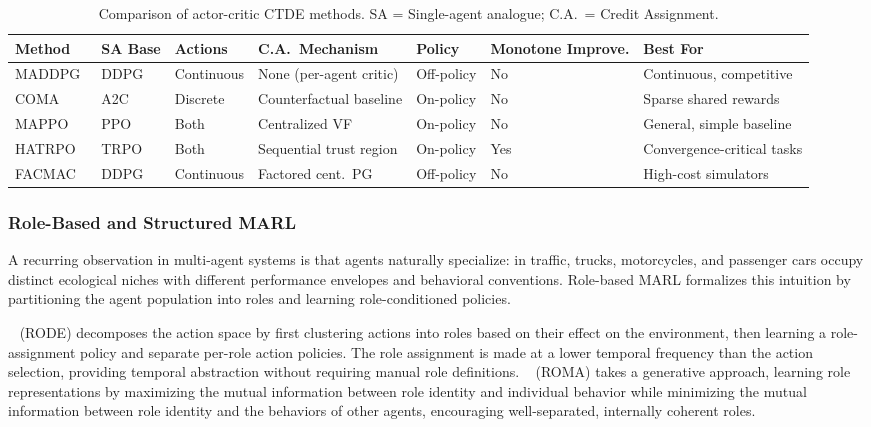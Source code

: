 \documentclass[12pt, a4paper]{article}
\begin{document}
\begin{table}[ht]
\centering
\caption{Comparison of actor-critic CTDE methods.
SA = Single-agent analogue; C.A.\ = Credit Assignment.
\label{tab:actorcritic}}
\renewcommand{\arraystretch}{1.2}
\small
\begin{tabular}{lllllll}
\toprule
\textbf{Method} & \textbf{SA Base} & \textbf{Actions} & \textbf{C.A.\ Mechanism}
& \textbf{Policy} & \textbf{Monotone Improve.} & \textbf{Best For} \\
\midrule
MADDPG~\cite{lowe2017multi}   & DDPG & Continuous & None (per-agent critic) & Off-policy & No  & Continuous, competitive \\
COMA~\cite{foerster2018counterfactual}   & A2C  & Discrete   & Counterfactual baseline & On-policy  & No  & Sparse shared rewards \\
MAPPO~\cite{yu2021surprising}  & PPO  & Both       & Centralized VF          & On-policy  & No  & General, simple baseline \\
HATRPO~\cite{kuba2021hatrpo}  & TRPO & Both       & Sequential trust region & On-policy  & Yes & Convergence-critical tasks \\
FACMAC~\cite{peng2021facmac}  & DDPG & Continuous & Factored cent.\ PG      & Off-policy & No  & High-cost simulators \\
\bottomrule
\end{tabular}
\end{table}

\subsubsection{Role-Based and Structured MARL}

A recurring observation in multi-agent systems is that agents naturally
specialize: in traffic, trucks, motorcycles, and passenger cars occupy
distinct ecological niches with different performance envelopes and
behavioral conventions.  Role-based MARL formalizes this intuition by
partitioning the agent population into roles and learning role-conditioned
policies.

\citeauthor{wang2021rode}~\cite{wang2021rode} (RODE) decomposes the action
space by first clustering actions into roles based on their effect on the
environment, then learning a role-assignment policy and separate per-role
action policies.  The role assignment is made at a lower temporal frequency
than the action selection, providing temporal abstraction without requiring
manual role definitions.  \citeauthor{wang2020roma}~\cite{wang2020roma}
(ROMA) takes a generative approach, learning role representations by
maximizing the mutual information between role identity and individual behavior
while minimizing the mutual information between role identity and the behaviors
of other agents, encouraging well-separated, internally coherent roles.
\end{document}
